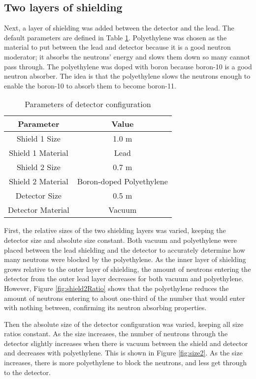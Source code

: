 \documentclass[12pt]{article}
\begin{document}
\subsection{Two layers of shielding}

Next, a layer of shielding was added between the detector and the lead. The default parameters are defined in Table \ref{table:twoLayers}. Polyethylene was chosen as the material to put between the lead and detector because it is a good neutron moderator; it absorbs the neutrons' energy and slows them down so many cannot pass through. The polyethylene was doped with boron because boron-10 is a good neutron absorber. The idea is that the polyethylene slows the neutrons enough to enable the boron-10 to absorb them to become boron-11.

\begin{table}[H]
  \caption{Parameters of detector configuration}
  \centering
  \begin{tabular}{c c}
  \hline\hline
  Parameter         & Value  \\
  \hline
  Shield 1 Size     & 1.0 m  \\
  Shield 1 Material & Lead   \\
  Shield 2 Size     & 0.7 m  \\
  Shield 2 Material & Boron-doped Polyethylene \\
  Detector Size     & 0.5 m  \\
  Detector Material & Vacuum \\
  \hline
  \end{tabular}
  \label{table:twoLayers}
\end{table}

First, the relative sizes of the two shielding layers was varied, keeping the detector size and absolute size constant. Both vacuum and polyethylene were placed between the lead shielding and the detector to accurately determine how many neutrons were blocked by the polyethylene. As the inner layer of shielding grows relative to the outer layer of shielding, the amount of neutrons entering the detector from the outer lead layer decreases for both vacuum and polyethylene. However, Figure \ref{fig:shield2Ratio} shows that the polyethylene reduces the amount of neutrons entering to about one-third of the number that would enter with nothing between, confirming its neutron absorbing properties.

Then the absolute size of the detector configuration was varied, keeping all size ratios constant. As the size increases, the number of neutrons through the detector slightly increases when there is vacuum between the shield and detector and decreases with polyethylene. This is shown in Figure \ref{fig:size2}. As the size increases, there is more polyethylene to block the neutrons, and less get through to the detector.
\end{document}
